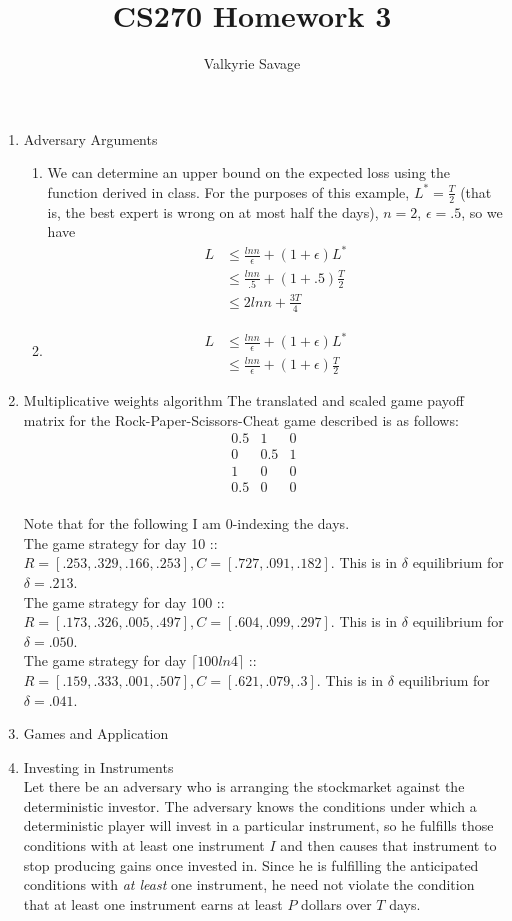 \documentclass[a4paper]{article}
\title{CS270 Homework 3}
\author{Valkyrie Savage}
\begin{document}
\maketitle

\begin{enumerate}
\item Adversary Arguments
	\begin{enumerate}
	\item We can determine an upper bound on the expected loss using the function derived in class.  For the purposes of this example, $L^*=\frac{T}{2}$ (that is, the best expert is wrong on at most half the days), $n=2$, $\epsilon = .5$, so we have
		\begin{align*}
			L &\leq \frac{ln n}{\epsilon} + (1 + \epsilon) L^* \\
			&\leq \frac{ln n}{.5} + (1 + .5)\frac{T}{2} \\
			&\leq 2 ln n + \frac{3T}{4}
		\end{align*}
	\item 
		\begin{align*}
			L &\leq \frac{ln n}{\epsilon} + (1 + \epsilon) L^* \\
			&\leq \frac{ln n}{\epsilon} + (1 + \epsilon)\frac{T}{2}
		\end{align*}
	\end{enumerate}
\item Multiplicative weights algorithm
The translated and scaled game payoff matrix for the Rock-Paper-Scissors-Cheat game described is as follows:
\[ \begin{array}{ccc}
0.5 & 1 & 0 \\
0 & 0.5 & 1 \\
1 & 0 & 0 \\
0.5 & 0 & 0 \end{array} \]\\
Note that for the following I am 0-indexing the days. \\
The game strategy for day 10 :: $R = [.253, .329, .166, .253], C = [.727, .091, .182]$.  This is in $\delta$ equilibrium for $\delta = .213$.\\
The game strategy for day 100 :: $R = [.173, .326, .005, .497], C = [.604, .099, .297]$.  This is in $\delta$ equilibrium for $\delta = .050$.\\
The game strategy for day $\lceil 100 ln 4 \rceil$ :: $R = [.159, .333, .001, .507], C = [.621, .079, .3]$.  This is in $\delta$ equilibrium for $\delta = .041$.\\
\item Games and Application
\item Investing in Instruments \\
Let there be an adversary who is arranging the stockmarket against the deterministic investor.  The adversary knows the conditions under which a deterministic player will invest in a particular instrument, so he fulfills those conditions with at least one instrument $I$ and then causes that instrument to stop producing gains once invested in.  Since he is fulfilling the anticipated conditions with \emph{at least} one instrument, he need not violate the condition that at least one instrument earns at least $P$ dollars over $T$ days.
\end{enumerate}
\end{document}

